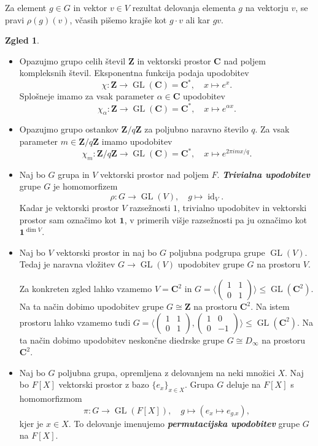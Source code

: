 \documentclass[11pt]{book}
\def\ZZ{\mathbf{Z}}
\def\CC{\mathbf{C}}
\def\11{\mathbf{1}}
\DeclareMathOperator\GL{GL}
\DeclareMathOperator\id{id}
\def\definicija{\color{rdeca}\bf\em}
\theoremstyle{definition}
\theoremstyle{zgled}
\newtheorem*{zgled}{Zgled}
\theoremstyle{odprtproblem}
\theoremstyle{domacanaloga}
\theoremstyle{izrek}
\begin{document}
Za element $g \in G$ in vektor $v \in V$ rezultat delovanja elementa $g$ na vektorju $v$, se pravi $\rho(g)(v)$, včasih pišemo krajše kot $g \cdot v$ ali kar $gv$.


\begin{zgled} \leavevmode
    \begin{itemize}
        \item Opazujmo grupo celih števil $\ZZ$ in vektorski prostor $\CC$ nad poljem kompleksnih števil. Eksponentna funkcija podaja upodobitev
        \[
            \chi \colon \ZZ \to \GL(\CC) = \CC^*, \quad
            x \mapsto e^x.
        \]
        Splošneje imamo za vsak parameter $\alpha \in \CC$ upodobitev
        \[
            \chi_{\alpha} \colon \ZZ \to \GL(\CC) = \CC^*, \quad
            x \mapsto e^{\alpha x}.
        \] 
        \item Opazujmo grupo ostankov $\ZZ/q\ZZ$ za poljubno naravno število $q$. Za vsak parameter $m \in \ZZ/q\ZZ$ imamo upodobitev
        \[
            \chi_m \colon \ZZ/q\ZZ \to \GL(\CC) = \CC^*, \quad
            x \mapsto e^{2 \pi i mx/q}.
        \]
        \item Naj bo $G$ grupa in $V$ vektorski prostor nad poljem $F$. {\definicija Trivialna upodobitev} grupe $G$ je homomorfizem
        \[
            \rho \colon G \to \GL(V), \quad
            g \mapsto \textstyle \id_V.
        \]
        Kadar je vektorski prostor $V$ razsežnosti $1$, trivialno upodobitev in vektorski prostor sam označimo kot $\11$, v primerih višje razsežnosti pa ju označimo kot $\11^{\dim V}$.
        \item Naj bo $V$ vektorski prostor in naj bo $G$ poljubna podgrupa grupe $\GL(V)$. Tedaj je naravna vložitev $G \to \GL(V)$ upodobitev grupe $G$ na prostoru $V$. 
        
        Za konkreten zgled lahko vzamemo $V = \CC^2$ in $G = \langle \left( \begin{smallmatrix} 1 & 1 \\ 0 & 1 \end{smallmatrix} \right) \rangle \leq \GL(\CC^2)$. Na ta način dobimo upodobitev grupe $G \cong \ZZ$ na prostoru $\CC^2$. Na istem prostoru lahko vzamemo tudi $G = \langle 
        \left( \begin{smallmatrix} 1 & 1 \\ 0 & 1 \end{smallmatrix} \right), \left( \begin{smallmatrix} 1 & 0 \\ 0 & -1 \end{smallmatrix} \right) \rangle \leq \GL(\CC^2)$. Na ta način dobimo upodobitev neskončne diedrske grupe $G \cong D_\infty$ na prostoru $\CC^2$.
        \item Naj bo $G$ poljubna grupa, opremljena z delovanjem na neki množici $X$. Naj bo $F[X]$ vektorski prostor z bazo $\{ e_x \}_{x \in X}$. Grupa $G$ deluje na $F[X]$ s homomorfizmom
        \[
            \pi \colon G \to \GL(F[X]), \quad
            g \mapsto \left( e_x \mapsto e_{g.x} \right),
        \]
        kjer je $x \in X$. To delovanje imenujemo {\definicija permutacijska upodobitev} grupe $G$ na $F[X]$. 
        

\end{itemize}
\end{zgled}
\end{document}
